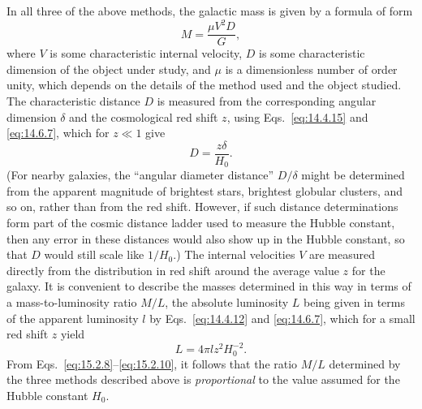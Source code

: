 In all three of the above methods, the galactic mass is given by a formula of
form
\begin{equation}
  M=\frac{\mu V^2D}{G},
  \tag{15.2.8}\label{eq:15.2.8}
\end{equation}
where \(V\) is some characteristic internal velocity, \(D\) is some
characteristic dimension of the object under study, and \(\mu\) is a
dimensionless number of order unity, which depends on the details of the method
used and the object studied. The characteristic distance \(D\) is measured
from the corresponding angular dimension \(\delta\) and the cosmological red
shift \(z\), using Eqs.~\eqref{eq:14.4.15} and \eqref{eq:14.6.7}, which
for \(z\ll1\) give
\begin{equation}
  D=\frac{z\delta}{H_0}.
  \tag{15.2.9}\label{eq:15.2.9}
\end{equation}
(For nearby galaxies, the ``angular diameter distance'' \(D/\delta\) might
be determined from the apparent magnitude of brightest stars, brightest
globular clusters, and so on, rather than from the red shift. However, if such
distance determinations form part of the cosmic distance ladder used to measure
the Hubble constant, then any error in these distances would also show up in the
Hubble constant, so that \(D\) would still scale like \(1/H_0\).) The
internal velocities \(V\) are measured directly from the distribution in red
shift around the average value \(z\) for the galaxy. It is convenient to
describe the masses determined in this way in terms of a mass-to-luminosity
ratio \(M/L\), the absolute luminosity \(L\) being given in terms of the
apparent luminosity \(l\) by Eqs.~\eqref{eq:14.4.12} and
\eqref{eq:14.6.7}, which for a small red shift \(z\) yield
\begin{equation}
  L=4\pi l z^2H_0^{-2}.
  \tag{15.2.10}\label{eq:15.2.10}
\end{equation}
From Eqs.~\eqref{eq:15.2.8}--\eqref{eq:15.2.10}, it follows that the ratio
\(M/L\) determined by the three methods described above is
\emph{proportional} to the value assumed for the Hubble constant \(H_0\).

